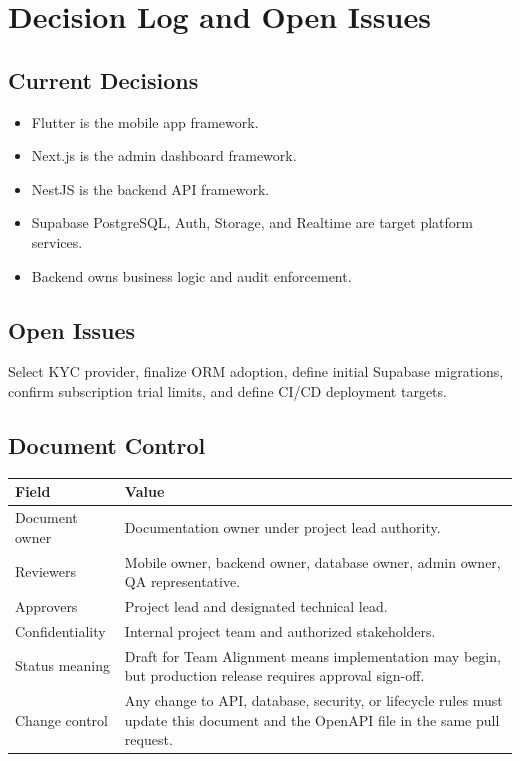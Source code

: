 \chapter{Decision Log and Open Issues}
\section{Current Decisions}
\begin{itemize}
  \item Flutter is the mobile app framework.
  \item Next.js is the admin dashboard framework.
  \item NestJS is the backend API framework.
  \item Supabase PostgreSQL, Auth, Storage, and Realtime are target platform services.
  \item Backend owns business logic and audit enforcement.
\end{itemize}
\section{Open Issues}
Select KYC provider, finalize ORM adoption, define initial Supabase migrations, confirm subscription trial limits, and define CI/CD deployment targets.

\section{Document Control}
\begin{longtable}{p{}p{}}
\toprule
Field & Value \\
\midrule
Document owner & Documentation owner under project lead authority. \\
Reviewers & Mobile owner, backend owner, database owner, admin owner, QA representative. \\
Approvers & Project lead and designated technical lead. \\
Confidentiality & Internal project team and authorized stakeholders. \\
Status meaning & Draft for Team Alignment means implementation may begin, but production release requires approval sign-off. \\
Change control & Any change to API, database, security, or lifecycle rules must update this document and the OpenAPI file in the same pull request. \\
\bottomrule
\end{longtable}
